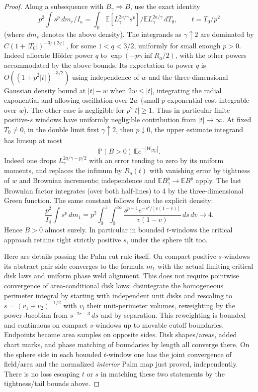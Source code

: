\begin{proof}
Along a subsequence with \(B_\gamma\Rightarrow B\), use the exact identity
\[
 p^2\int s^p\,dm_r/I_\kappa
 =\int_{\mathbb R}\mathbb E[L_\gamma^{2a/\gamma}s^p]/\mathbb E L_\gamma^{2a/\gamma}\,dT_0,\qquad t=T_0/p^2
\]
(where \(dm_r\) denotes the above density).
The integrands as \(\gamma\uparrow2\) are dominated by \(C(1+|T_0|)^{-3/(2q)}\), for some \(1<q<3/2\), uniformly for small enough \(p>0\).
Indeed allocate Hölder power \(q\) to \(\exp(-p\gamma\inf R_a/2)\), with the other powers accommodated by the above bounds.
Its expectation to power \(q\) is \(O((1+p^2|t|)^{-3/2})\) using independence of \(w\) and the three-dimensional Gaussian density bound at \(|t|-w\) when \(2w\le |t|\), integrating the radial exponential and allowing oscillation over \(2w\) (small-\(p\) exponential cost integrable over \(w\)).
The other case is negligible for \(p^2|t|\ge1\).
Thus in particular finite positive-\(s\) windows have uniformly negligible contribution from \(|t|\to\infty\).
At fixed \(T_0\ne0\), in the double limit first \(\gamma\uparrow2\), then \(p\downarrow0\), the upper estimate integrand has limsup at most
\[
 {\mathbb P}(B>0)\,\mathbb E e^{-|W_{|T_0|}|}.
\]
Indeed one drops \(L_\gamma^{2a/\gamma-p/2}\) with an error tending to zero by its uniform moments, and replaces the infimum by \(R_a(t)\) with vanishing error by tightness of \(w\) and Brownian increments; independence and \(\mathbb E B_\gamma^p\to\mathbb E B^p\) apply.
The last Brownian factor integrates (over both half-lines) to 4 by the three-dimensional Green function.
The same constant follows from the explicit density:
\[
 \frac{p^2}{I_4}\int s^p\,dm_1
 =p^2\int_0^1\int_0^\infty
       \frac{s^{p-1}e^{-s^2/[v(1-v)]}}{v(1-v)}\,ds\,dv
 \longrightarrow4.
\]
Hence \(B>0\) almost surely.
In particular in bounded \(t\)-windows the critical approach retains tight strictly positive \(s\), under the sphere tilt too.


Here are details passing the Palm cut rule itself.
On compact positive \(s\)-windows its abstract pair side converges to the formula \(m_1\) with the actual limiting critical disk laws and uniform phase weld alignment.
This does not require pointwise convergence of area-conditional disk laws: disintegrate the homogeneous perimeter integral by starting with independent unit disks and rescaling to \(s=(v_1+v_2)^{-1/2}\) with \(v_i\) their unit-perimeter volumes, reweighting by the power Jacobian from \(s^{-2r-3}\,ds\) and by separation.
This reweighting is bounded and continuous on compact \(s\)-windows up to movable cutoff boundaries.
Endpoints become area samples on opposite sides.
Disk shapes/areas, added chart marks, and phase matching of boundaries by length all converge there.
On the sphere side in each bounded \(t\)-window one has the joint convergence of field/area and the normalized \emph{interior} Palm map just proved, independently.
There is no loss escaping \(t\) or \(s\) in matching these two statements by the tightness/tail bounds above.


\end{proof}
